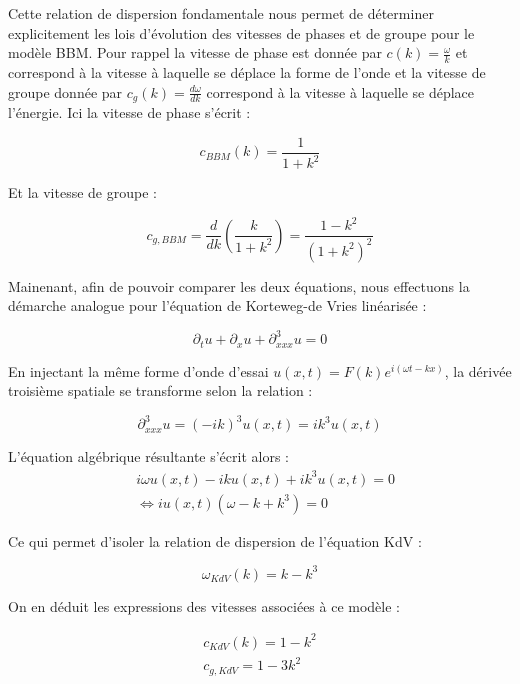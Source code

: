 Cette relation de dispersion fondamentale nous permet de déterminer explicitement les lois d'évolution des vitesses de phases et de groupe pour le modèle BBM. Pour rappel la vitesse de phase est donnée par $c(k) = \frac{\omega}{k}$ et correspond à la vitesse à laquelle se déplace la forme de l'onde et la vitesse de groupe donnée par $c_g(k) = \frac{d\omega}{dk}$ correspond à la vitesse à laquelle se déplace l'énergie. Ici la vitesse de phase s'écrit :

\begin{equation*}
    c_{BBM}(k) = \frac{1}{1+k^2}
\end{equation*}

 Et la vitesse de groupe :

\begin{equation*}
c_{g,BBM} = \frac{d}{dk} \left( \frac{k}{1+k^2}\right) = \frac{1 - k^2}{(1 + k^2)^2}
\end{equation*}

 Mainenant, afin de pouvoir comparer les deux équations, nous effectuons la démarche analogue pour l'équation de Korteweg-de Vries linéarisée :

 \begin{equation}
     \partial_t u + \partial_x u + \partial^3_{xxx} u = 0
 \end{equation}

En injectant la même forme d'onde d'essai $u(x,t) = F(k)e^{i(\omega t - kx)}$, la dérivée troisième spatiale se transforme selon la relation :

\begin{equation*}
    \partial^3_{xxx} u = (-ik)^3u(x,t) = ik^3u(x,t)
\end{equation*}

L'équation algébrique résultante s'écrit alors : 
\begin{align*}
    &i \omega u (x,t) - ik u(x,t) + i k^3 u(x,t) = 0 \\
    &\Leftrightarrow iu(x,t)(\omega - k + k^3) = 0
\end{align*}

Ce qui permet d'isoler la relation de dispersion de l'équation KdV :

\begin{equation*}
    \omega_{KdV}(k) = k - k^3
\end{equation*}

On en déduit les expressions des vitesses associées à ce modèle : 

\begin{align*}
    c_{KdV}(k) = 1 - k^2\\
    c_{g,KdV} = 1 - 3k^2
\end{align*}













